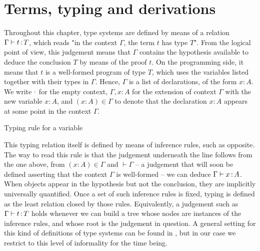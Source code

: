\section{Terms, typing and derivations}
\label{sec:tech-typing}

Throughout this chapter, type systems are defined by means of a relation
$\Gamma \vdash t \ty T$, which reads "in the context $\Gamma$, the term $t$ has type $T$".
From the logical point of view, this judgement means that $\Gamma$
contains the hypothesis available to deduce the
conclusion $T$ by means of the proof $t$.
On the programming side, it means that $t$ is a well-formed program of type $T$,
which uses the variables listed together with their types in $\Gamma$.
Hence, $\Gamma$ is a list of declarations, of the form $x : A$.
We write $\emptycon$ for the empty context,
$\Gamma, x : A$ for the extension of context $\Gamma$ with the new variable $x : A$,
and $(x : A) \in \Gamma$ to denote that the declaration $x : A$ appears at some
point in the context $\Gamma$.

\begin{marginfigure}
  \ContinuedFloat*
  \begin{mathpar}
  \label{rule:cic-var}
  \end{mathpar}
  \caption{Typing rule for a variable}
  \label{fig:cic-var}
\end{marginfigure}

This typing relation itself is defined by means of inference rules,
such as  opposite. The way to read this rule is that the judgement
underneath the line follows from the one above,
\ie from $(x : A) \in \Gamma$
and $\vdash \Gamma$ – a judgement that will soon be defined asserting that the context
$\Gamma$ is well-formed – we can deduce $\Gamma \vdash x \ty A$.
When objects appear in the hypothesis but not the conclusion, they are implicitly
universally quantified.
Once a set of such inference rules is fixed,
typing is defined as the least relation closed by those
rules. Equivalently, a judgement such as $\Gamma \vdash t \ty T$
holds whenever we can build a tree whose nodes are instances of the inference rules,
and whose root is the judgement in question. A general setting
for this kind of definitions of type systems can be found in ,
but in our case we restrict to this level of informality for the time being.%

